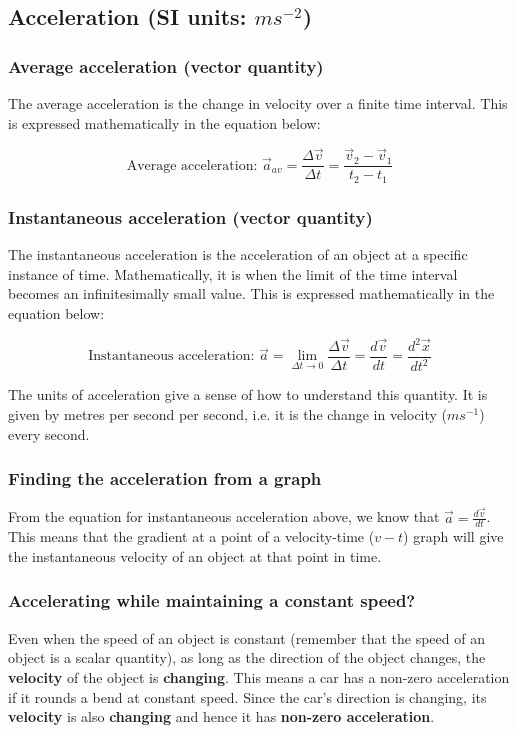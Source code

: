 \documentclass[11pt]{article}
\begin{document}
\subsection{Acceleration (SI units: \(\si{ms^{-2}}\))}
\label{sec:org105c9c9}

\subsubsection{Average acceleration (vector quantity)}
\label{sec:org0f7e0cb}
The average acceleration is the change in velocity over a finite time interval. This is expressed mathematically in the equation below:

\[\text{Average acceleration: } \vec{a}_{av} = \frac{\Delta \vec{v}}{\Delta t} = \frac{\vec{v}_2 - \vec{v}_1}{t_2 - t_1}\]
\subsubsection{Instantaneous acceleration (vector quantity)}
\label{sec:org0ca8f0f}
The instantaneous acceleration is the acceleration of an object at a specific instance of time. Mathematically, it is when the limit of the time interval becomes an infinitesimally small value. This is expressed mathematically in the equation below:

\[\text{Instantaneous acceleration: } \vec{a} = \lim_{\Delta t \rightarrow 0} \frac{\Delta \vec{v}}{\Delta t} = \frac{d \vec{v}}{dt} = \frac{d^2 \vec{x}}{dt^2}\]

The units of acceleration give a sense of how to understand this quantity. It is given by metres per second per second, i.e. it is the change in velocity (\(\si{ms^{-1}}\)) every second.
\subsubsection{Finding the acceleration from a graph}
\label{sec:org5239c76}
From the equation for instantaneous acceleration above, we know that \(\vec{a} = \frac{d \vec{v}}{dt}\). This means that the gradient at a point of a velocity-time (\(v - t\)) graph will give the instantaneous velocity of an object at that point in time.
\subsubsection{Accelerating while maintaining a constant speed?}
\label{sec:org35a935b}
Even when the speed of an object is constant (remember that the speed of an object is a scalar quantity), as long as the direction of the object changes, the \textbf{velocity} of the object is \textbf{changing}. This means a car has a non-zero acceleration if it rounds a bend at constant speed. Since the car's direction is changing, its \textbf{velocity} is also \textbf{changing} and hence it has \textbf{non-zero acceleration}.
\end{document}
